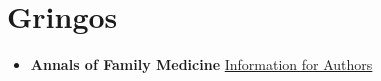 \documentclass[]{book}
\providecommand{\tightlist}{%
  \setlength{\itemsep}{0pt}\setlength{\parskip}{0pt}}
\begin{document}
\hypertarget{gringos}{%
\section*{Gringos}\label{gringos}}

\begin{itemize}
\tightlist
\item
  \textbf{Annals of Family Medicine} \href{http://www.annfammed.org/}{Information for Authors}
\end{itemize}


\end{document}
